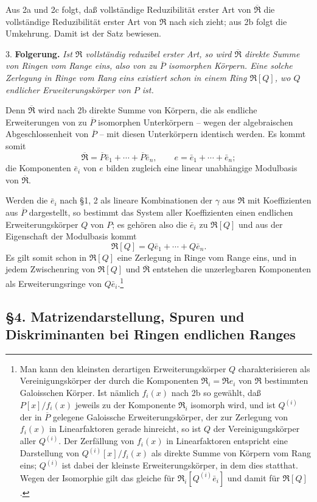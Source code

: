 \documentclass[11pt]{article}
\providecommand{\mR}{\mathfrak{R}}
\providecommand{\bR}{\overline{\mathfrak{R}}}
\providecommand{\bP}{\overline{P}}
\begin{document}
Aus 2a und 2c folgt, daß vollständige Reduzibilität erster Art von $\bR$ die vollständige Reduzibilität erster Art von $\mR$ nach sich zieht; aus 2b folgt die Umkehrung. Damit ist der Satz bewiesen.

3. \textbf{Folgerung.} \emph{Ist $\mR$ vollständig reduzibel erster Art, so wird $\bR$ direkte Summe von Ringen vom Range eins, also von zu $\bP$ isomorphen Körpern. Eine solche Zerlegung in Ringe vom Rang eins existiert schon in einem Ring $\mR[Q]$, wo $Q$ endlicher Erweiterungskörper von $P$ ist.}

Denn $\bR$ wird nach 2b direkte Summe von Körpern, die als endliche Erweiterungen von zu $\bP$ isomorphen Unterkörpern -- wegen der algebraischen Abgeschlossenheit von $\bP$ -- mit diesen Unterkörpern identisch werden. Es kommt somit
\[
        \bR=\bP\bar e_1+\cdots+\bP\bar e_n,
        \qquad e=\bar e_1+\cdots+\bar e_n;
\]
die Komponenten $\bar e_i$ von $e$ bilden zugleich eine linear unabhängige Modulbasis von $\bR$.

Werden die $\bar e_i$ nach §1, 2 als lineare Kombinationen der $\gamma$ aus $\mR$ mit Koeffizienten aus $\bP$ dargestellt, so bestimmt das System aller Koeffizienten einen endlichen Erweiterungskörper $Q$ von $P$; es gehören also die $\bar e_i$ zu $\mR[Q]$ und aus der Eigenschaft der Modulbasis kommt
\[
        \mR[Q]=Q\bar e_1+\cdots+Q\bar e_n.
\]
Es gilt somit schon in $\mR[Q]$ eine Zerlegung in Ringe vom Range eins, und in jedem Zwischenring von $\mR[Q]$ und $\bR$ entstehen die unzerlegbaren Komponenten als Erweiterungsringe von $Q\bar e_i$.\footnote{Man kann den kleinsten derartigen Erweiterungskörper $Q$ charakterisieren als Vereinigungskörper der durch die Komponenten $\mR_i=\mR e_i$ von $\mR$ bestimmten Galoisschen Körper. Ist nämlich $f_i(x)$ nach 2b so gewählt, daß $P[x]/f_i(x)$ jeweils zu der Komponente $\mR_i$ isomorph wird, und ist $Q^{(i)}$ der in $\bP$ gelegene Galoissche Erweiterungskörper, der zur Zerlegung von $f_i(x)$ in Linearfaktoren gerade hinreicht, so ist $Q$ der Vereinigungskörper aller $Q^{(i)}$. Der Zerfällung von $f_i(x)$ in Linearfaktoren entspricht eine Darstellung von $Q^{(i)}[x]/f_i(x)$ als direkte Summe von Körpern vom Rang eins; $Q^{(i)}$ ist dabei der kleinste Erweiterungskörper, in dem dies statthat. Wegen der Isomorphie gilt das gleiche für $\mR_i[Q^{(i)}\bar e_i]$ und damit für $\mR[Q]$.}

\subsection*{§4. Matrizendarstellung, Spuren und Diskriminanten bei Ringen endlichen Ranges}
\end{document}
